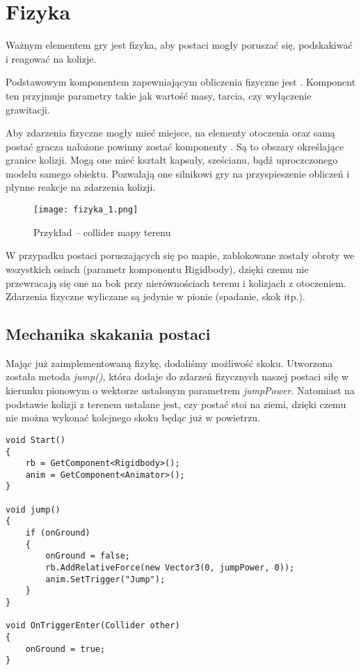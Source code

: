 \section{Fizyka}\label{sec:fizyka}

Ważnym elementem gry jest fizyka, aby postaci mogły poruszać się, podskakiwać i reagować na kolizje.

Podstawowym komponentem zapewniającym obliczenia fizyczne jest . Komponent ten przyjmuje parametry takie jak wartość masy, tarcia, czy wyłączenie grawitacji.

Aby zdarzenia fizyczne mogły mieć miejsce, na elementy otoczenia oraz samą postać gracza nałożone powinny zostać komponenty . Są to obszary określające granice kolizji. Mogą one mieć kształt kapsuły, sześcianu, bądź uproczczonego modelu samego obiektu. Pozwalają one silnikowi gry na przyspieszenie obliczeń i płynne reakcje na zdarzenia kolizji.

\begin{figure}[H]
\center
\texttt{[image: fizyka\_1.png]}
\caption{Przykład -- collider mapy terenu}
\end{figure}

W przypadku postaci poruszających się po mapie, zablokowane zostały obroty we wszystkich osiach (parametr  komponentu Rigidbody), dzięki czemu nie przewracają się one na bok przy nierównościach terenu i kolizjach z otoczeniem. Zdarzenia fizyczne wyliczane są jedynie w pionie (spadanie, skok itp.).

\subsection{Mechanika skakania postaci}

Mając już zaimplementowaną fizykę, dodaliśmy możliwość skoku. Utworzona została metoda \textit{jump()}, która dodaje do zdarzeń fizycznych naszej postaci siłę w kierunku pionowym o wektorze ustalonym parametrem \textit{jumpPower}. Natomiast na podstawie kolizji z terenem ustalane jest, czy postać stoi na ziemi, dzięki czemu nie można wykonać kolejnego skoku będąc już w powietrzu.
\\
\begin{lstlisting}[caption={Fragment algorytmu skoku postaci}]
void Start()
{
    rb = GetComponent<Rigidbody>();
    anim = GetComponent<Animator>();
}

void jump()
{
    if (onGround)
    {
        onGround = false;
        rb.AddRelativeForce(new Vector3(0, jumpPower, 0));
        anim.SetTrigger("Jump");
    }
}

void OnTriggerEnter(Collider other)
{
    onGround = true;
}
\end{lstlisting}